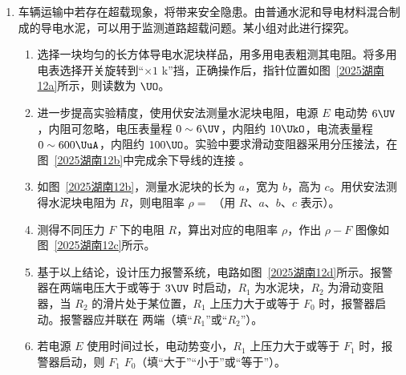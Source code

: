 \documentclass[\gkver]{gaokaozhenti}
\begin{document}
\begin{enumerate}
\item
车辆运输中若存在超载现象，将带来安全隐患。由普通水泥和导电材料混合制成的导电水泥，可以用于监测道路超载问题。某小组对此进行探究。
\begin{enumerate}
	\item
	选择一块均匀的长方体导电水泥块样品，用多用电表粗测其电阻。将多用电表选择开关旋转到“$\times1$ k”挡，正确操作后，指针位置如图~\ref{2025湖南12a}所示，则读数为  $\UO$。
	\item
	进一步提高实验精度，使用伏安法测量水泥块电阻，电源 $E$ 电动势 $6 \UV$，内阻可忽略，电压表量程 $0\sim6 \UV$，内阻约 $10 \UkO$，电流表量程 $0\sim600 \UuA$，内阻约 $100 \UO$。实验中要求滑动变阻器采用分压接法，在图~\ref{2025湖南12b}中完成余下导线的连接 \tkanswer[2cm]{}。
	\item
	如图~\ref{2025湖南12b}，测量水泥块的长为 $a$，宽为 $b$，高为 $c$。用伏安法测得水泥块电阻为 $R$，则电阻率 $\rho=$ （用 $R$、$a$、$b$、$c$ 表示）。
	\item
	测得不同压力 $F$ 下的电阻 $R$，算出对应的电阻率 $\rho$，作出 $\rho-F$ 图像如图~\ref{2025湖南12c}所示。
	\item
	基于以上结论，设计压力报警系统，电路如图~\ref{2025湖南12d}所示。报警器在两端电压大于或等于 $3 \UV$ 时启动，$R_{1}$ 为水泥块，$R_{2}$ 为滑动变阻器，当 $R_{2}$ 的滑片处于某位置，$R_{1}$ 上压力大于或等于 $F_{0}$ 时，报警器启动。报警器应并联在  两端（填“$R_{1}$”或“$R_{2}$”）。
	\item
	若电源 $E$ 使用时间过长，电动势变小，$R_{1}$ 上压力大于或等于 $F_{1}$ 时，报警器启动，则 $F_{1}$  $F_{0}$（填“大于”“小于”或“等于”）。
\end{enumerate}

\end{enumerate}
\end{document}

